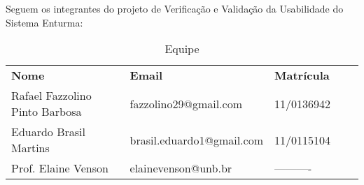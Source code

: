 
Seguem os integrantes do projeto de Verificação e Validação da Usabilidade do Sistema Enturma:

\begin{table}[!ht]
	\centering
	\label{equipe}
	\begin{tabular}{|l|l|l|ll}
		\cline{1-3}
		{\bf Nome}                     & {\bf Email}               & {\bf Matrícula} &  &  \\ \cline{1-3}
		Rafael Fazzolino Pinto Barbosa & fazzolino29@gmail.com     & 11/0136942      &  &  \\ \cline{1-3}
		Eduardo Brasil Martins         & brasil.eduardo1@gmail.com & 11/0115104      &  &  \\ \cline{1-3}
		Prof. Elaine Venson            & elainevenson@unb.br       & ----------      &  &  \\ \cline{1-3}
	\end{tabular}
	\caption{Equipe}
\end{table}